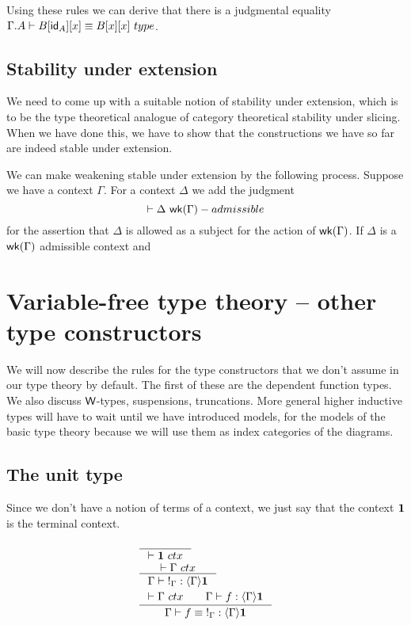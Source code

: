 Using these rules we can derive that there is a judgmental equality $\jtypeeq{\ctxext{\Gamma}{A}}{\subst{x}{{\idfunc[A]}{B}}}
{\subst{x}{{x}{B}}}$.

\subsection{Stability under extension}
We need to come up with a suitable notion of stability under extension, which
is to be the type theoretical analogue of category theoretical stability under
slicing. When we have done this, we have to show that the constructions we have
so far are indeed stable under extension.

We can make weakening stable under extension by the following
process. Suppose we have a context $\Gamma$. For a context $\Delta$ we add the
judgment
\begin{equation*}
\vdash \Delta~\mathsf{wk}(\Gamma)-admissible
\end{equation*}
for the assertion that $\Delta$ is allowed as a subject for the action of
$\mathsf{wk}(\Gamma)$. If $\Delta$ is a $\mathsf{wk}(\Gamma)$ admissible context and



\section{Variable-free type theory -- other type constructors}
We will now describe the rules for the type constructors that we don't assume
in our type theory by default. The first of these are the dependent function
types. We also discuss $\mathsf{W}$-types, suspensions, truncations. More general higher inductive
types will have to wait until we have introduced models, for the models of the
basic type theory because we will use them as index categories of the diagrams.

\subsection{The unit type}
Since we don't have a notion of terms of a context, we just say that the context
$\mathbf{1}$ is the terminal context.

\begin{align}
& \inference{}{\jctx{\unit}}\\
& \inference{\jctx{\Gamma}}{\jhom{\Gamma}{\unit}{\tounit{\Gamma}}}\\
& \inference{\jctx{\Gamma}\qquad\jhom{\Gamma}{\unit}{f}}{\jhomeq{\Gamma}{\unit}{f}{\tounit{\Gamma}}}
\end{align}

